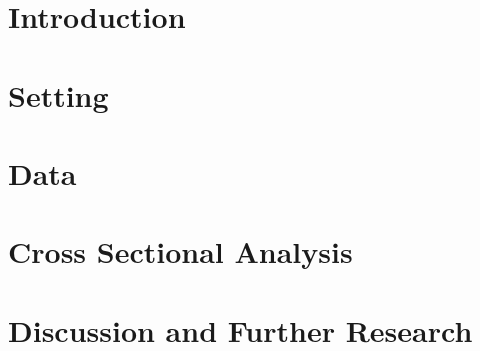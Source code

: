 \documentclass[english, 11pt]{article}
\begin{document}

\clearpage

\thispagestyle{empty}


\clearpage

{ \tableofcontents }
\thispagestyle{empty}

\clearpage
\setcounter{page}{1}
\section{Introduction} \label{section:Introduction}

\clearpage

\section{Setting}
\label{section:Setting}

\clearpage

\section{Data}
\label{section:data}

\clearpage

\section{Cross Sectional Analysis}
\label{section:cross}

\clearpage

\section{Discussion and Further Research}
\label{section:disco}

\clearpage

%

\clearpage


\end{document}
